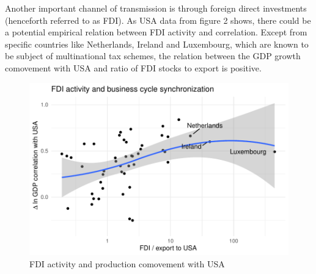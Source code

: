 \documentclass{article}
\begin{document}
Another important channel of transmission is through foreign direct investments (henceforth referred to as FDI). As USA data from figure 2 shows, there could be a potential empirical relation between FDI activity and correlation. Except from specific countries like Netherlands, Ireland and Luxembourg, which are known to be subject of multinational tax schemes, the relation between the GDP growth comovement with USA and ratio of FDI stocks to export is positive.

\begin{figure}[ht]
\centering
\includegraphics[scale=0.8]{graphs/usa_fdi_plot.pdf}
\caption{FDI activity and production comovement with USA}
\end{figure}
\end{document}
